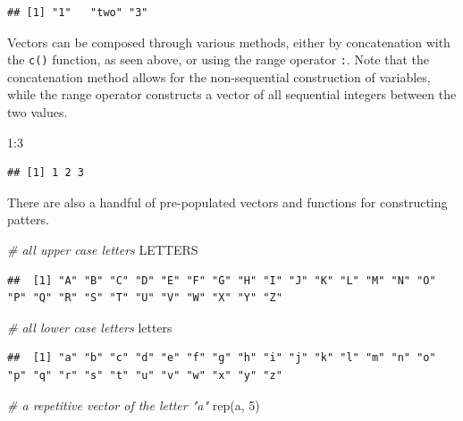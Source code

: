 \documentclass[
]{book}
\newenvironment{Shaded}{\begin{snugshade}}{\end{snugshade}}
\newcommand{\CommentTok}[1]{\textcolor[rgb]{0.56,0.35,0.01}{\textit{#1}}}
\newcommand{\DecValTok}[1]{\textcolor[rgb]{0.00,0.00,0.81}{#1}}
\newcommand{\FunctionTok}[1]{\textcolor[rgb]{0.00,0.00,0.00}{#1}}
\newcommand{\NormalTok}[1]{#1}
\newcommand{\SpecialCharTok}[1]{\textcolor[rgb]{0.00,0.00,0.00}{#1}}
\newcommand{\StringTok}[1]{\textcolor[rgb]{0.31,0.60,0.02}{#1}}
\begin{document}
\begin{verbatim}
## [1] "1"   "two" "3"
\end{verbatim}

Vectors can be composed through various methods, either by concatenation with the \texttt{c()} function, as seen above, or using the range operator \texttt{:}. Note that the concatenation method allows for the non-sequential construction of variables, while the range operator constructs a vector of all sequential integers between the two values.

\begin{Shaded}
\begin{Highlighting}[]
\DecValTok{1}\SpecialCharTok{:}\DecValTok{3}
\end{Highlighting}
\end{Shaded}

\begin{verbatim}
## [1] 1 2 3
\end{verbatim}

There are also a handful of pre-populated vectors and functions for constructing patters.

\begin{Shaded}
\begin{Highlighting}[]
\CommentTok{\# all upper case letters}
\NormalTok{LETTERS}
\end{Highlighting}
\end{Shaded}

\begin{verbatim}
##  [1] "A" "B" "C" "D" "E" "F" "G" "H" "I" "J" "K" "L" "M" "N" "O" "P" "Q" "R" "S" "T" "U" "V" "W" "X" "Y" "Z"
\end{verbatim}

\begin{Shaded}
\begin{Highlighting}[]
\CommentTok{\# all lower case letters}
\NormalTok{letters}
\end{Highlighting}
\end{Shaded}

\begin{verbatim}
##  [1] "a" "b" "c" "d" "e" "f" "g" "h" "i" "j" "k" "l" "m" "n" "o" "p" "q" "r" "s" "t" "u" "v" "w" "x" "y" "z"
\end{verbatim}

\begin{Shaded}
\begin{Highlighting}[]
\CommentTok{\# a repetitive vector of the letter "a"}
\FunctionTok{rep}\NormalTok{(}\StringTok{\textquotesingle{}a\textquotesingle{}}\NormalTok{, }\DecValTok{5}\NormalTok{)}
\end{Highlighting}
\end{Shaded}
\end{document}
